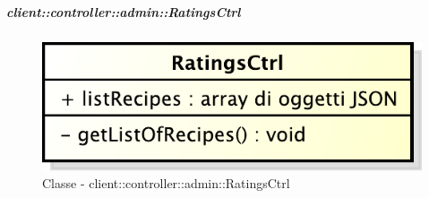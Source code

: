 		\subparagraph{client::controller::admin::RatingsCtrl} %
		\label{subp:bdsm_app_client_controller_admin_ratingsctrl}
			\begin{figure}[htbp]
				\centering
				\centerline{\includegraphics[scale=0.7]{./images/client/classes/controller/ratings_ctrl.pdf}}
				\caption{Classe - client::controller::admin::RatingsCtrl}
			\end{figure}
